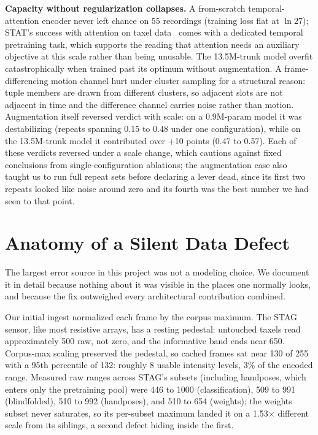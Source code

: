 \documentclass[conference]{IEEEtran}
\begin{document}
\textbf{Capacity without regularization collapses.} A from-scratch temporal-attention
encoder never left chance on 55 recordings (training loss flat at $\ln 27$); STAT's
success with attention on taxel data~\cite{lin2024stat} comes with a dedicated temporal
pretraining task, which supports the reading that attention needs an auxiliary objective at
this scale rather than being unusable. The 13.5M-trunk model overfit catastrophically when trained
past its optimum without augmentation. A frame-differencing motion channel hurt under
cluster sampling for a structural reason: tuple members are drawn from different clusters,
so adjacent slots are not adjacent in time and the difference channel carries noise
rather than motion. Augmentation itself reversed verdict with scale: on a 0.9M-param
model it was destabilizing (repeats spanning 0.15 to 0.48 under one configuration), while
on the 13.5M-trunk model it contributed over +10 points (0.47 to 0.57). Each of these verdicts
reversed under a scale change, which cautions against fixed conclusions from
single-configuration ablations; the augmentation case also taught us to run full repeat
sets before declaring a lever dead, since its first two repeats looked like noise around
zero and its fourth was the best number we had seen to that point.

\section{Anatomy of a Silent Data Defect}
\label{sec:forensics}
The largest error source in this project was not a modeling choice. We document it in
detail because nothing about it was visible in the places one normally looks, and because
the fix outweighed every architectural contribution combined.

Our initial ingest normalized each frame by the corpus maximum. The STAG sensor, like most
resistive arrays, has a resting pedestal: untouched taxels read approximately 500 raw, not
zero, and the informative band ends near 650. Corpus-max scaling preserved the pedestal, so
cached frames sat near 130 of 255 with a 95th percentile of 132: roughly 8 usable intensity
levels, 3\% of the encoded range. Measured raw ranges across STAG's subsets (including
handposes, which enters only the pretraining pool) were 446 to 1000 (classification), 509
to 991 (blindfolded), 510 to 992 (handposes), and 510 to 654 (weights); the weights subset never saturates, so its per-subset maximum landed it on a
1.53$\times$ different scale from its siblings, a second defect hiding inside the first.
\end{document}
